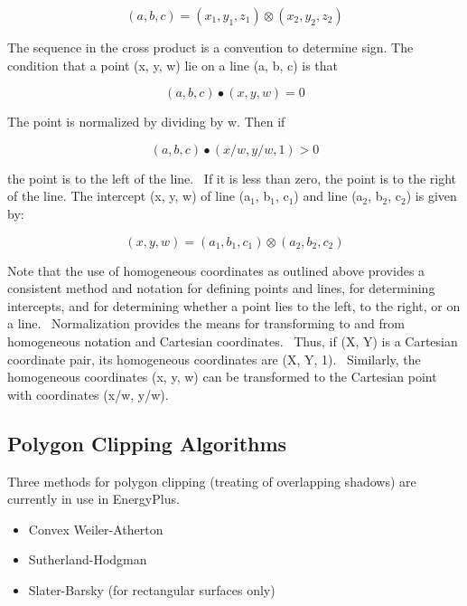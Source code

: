 \begin{equation}
(a,b,c) = ({x_1},{y_1},{z_1}) \otimes ({x_2},{y_2},{z_2})
\end{equation}

The sequence in the cross product is a convention to determine sign. The condition that a point (x, y, w) lie on a line (a, b, c) is that

\begin{equation}
(a,b,c) \bullet (x,y,w) = 0
\end{equation}

The point is normalized by dividing by w. Then if

\begin{equation}
(a,b,c) \bullet (x/w,y/w,1) > 0
\end{equation}

the point is to the left of the line.~ If it is less than zero, the point is to the right of the line. The intercept (x, y, w) of line (a\(_{1}\), b\(_{1}\), c\(_{1}\)) and line (a\(_{2}\), b\(_{2}\), c\(_{2}\)) is given by:

\begin{equation}
(x,y,w) = ({a_1},{b_1},{c_1}) \otimes ({a_2},{b_2},{c_2})
\end{equation}

Note that the use of homogeneous coordinates as outlined above provides a consistent method and notation for defining points and lines, for determining intercepts, and for determining whether a point lies to the left, to the right, or on a line.~ Normalization provides the means for transforming to and from homogeneous notation and Cartesian coordinates.~ Thus, if (X, Y) is a Cartesian coordinate pair, its homogeneous coordinates are (X, Y, 1).~ Similarly, the homogeneous coordinates (x, y, w) can be transformed to the Cartesian point with coordinates (x/w, y/w).

\subsection{Polygon Clipping Algorithms}\label{polygon-clipping-algorithms}

Three methods for polygon clipping (treating of overlapping shadows) are currently in use in EnergyPlus.

\begin{itemize}
\item
  Convex Weiler-Atherton
\item
  Sutherland-Hodgman
\item
  Slater-Barsky (for rectangular surfaces only)
\end{itemize}

